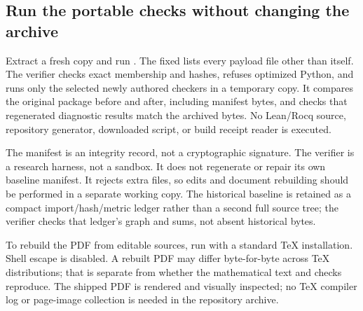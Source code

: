 \subsection{Run the portable checks without changing the archive}
Extract a fresh copy and run . The fixed  lists every payload file other than itself. The verifier checks exact membership and hashes, refuses optimized Python, and runs only the selected newly authored checkers in a temporary copy. It compares the original package before and after, including manifest bytes, and checks that regenerated diagnostic results match the archived bytes. No Lean/Rocq source, repository generator, downloaded script, or build receipt reader is executed.

The manifest is an integrity record, not a cryptographic signature. The verifier is a research harness, not a sandbox. It does not regenerate or repair its own baseline manifest. It rejects extra files, so edits and document rebuilding should be performed in a separate working copy. The historical baseline is retained as a compact import/hash/metric ledger rather than a second full source tree; the verifier checks that ledger's graph and sums, not absent historical bytes.

To rebuild the PDF from editable sources, run  with a standard TeX installation. Shell escape is disabled. A rebuilt PDF may differ byte-for-byte across TeX distributions; that is separate from whether the mathematical text and checks reproduce. The shipped PDF is rendered and visually inspected; no TeX compiler log or page-image collection is needed in the repository archive.
